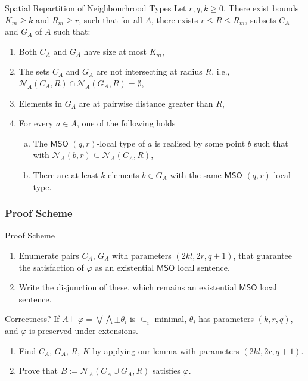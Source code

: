 \documentclass{beamer}
\newcommand{\tightlist}{}
\begin{document}
\begin{frame}{Spatial Repartition of Neighbourhrood Types}
\protect\hypertarget{spatial-repartition-of-neighbourhrood-types}{}
Let \(r,q,k \geq 0\). There exist bounds \(K_m \geq k\) and
\(R_m \geq r\), such that for all \(A\), there exists
\(r \leq R \leq R_m\), subsets \(C_A\) and \(G_A\) of \(A\) such that:

\begin{enumerate}
\tightlist
\item
  Both \(C_A\) and \(G_A\) have size at most \(K_m\),
\item
  The sets \(C_A\) and \(G_A\) are not intersecting at radius \(R\),
  i.e.,
  \(\mathcal{N}_{A}(C_A, R) \cap \mathcal{N}_{A}(G_A, R) = \emptyset\),
\item
  Elements in \(G_A\) are at pairwise distance greater than \(R\),
\item
  For every \(a \in A\), one of the following holds

  \begin{enumerate}
  [a.]
  \tightlist
  \item
    The \(\mathsf{MSO}\) \((q,r)\)-local type of \(a\) is realised by
    some point \(b\) such that with
    \(\mathcal{N}_{A}(b, r) \subseteq \mathcal{N}_{A}(C_A, R)\),
  \item
    There are at least \(k\) elements \(b \in G_A\) with the same
    \(\mathsf{MSO}\) \((q,r)\)-local type.
  \end{enumerate}
\end{enumerate}
\end{frame}

\subsubsection{Proof Scheme}\label{proof-scheme}

\begin{frame}{Proof Scheme}
\begin{enumerate}
\tightlist
\item
  Enumerate pairs \(C_A\), \(G_A\) with parameters \((2kl, 2r, q+1)\),
  that guarantee the satisfaction of \(\varphi\) as an existential
  \(\mathsf{MSO}\) local sentence.
\item
  Write the disjunction of these, which remains an existential
  \(\mathsf{MSO}\) local sentence.
\end{enumerate}
\end{frame}

\begin{frame}{Correctness?}
\protect\hypertarget{correctness}{}
If \(A \models \varphi = \bigvee \bigwedge \pm \theta_i\) is
\(\subseteq_i\)-minimal, \(\theta_i\) has parameters \((k,r,q)\), and
\(\varphi\) is preserved under extensions.

\begin{enumerate}
\tightlist
\item
  Find \(C_A\), \(G_A\), \(R\), \(K\) by applying our lemma with
  parameters \((2kl, 2r, q + 1)\).
\item
  Prove that \(B := \mathcal{N}_{A}(C_A \cup G_A, R)\) satisfies
  \(\varphi\).
\end{enumerate}
\end{frame}
\end{document}
